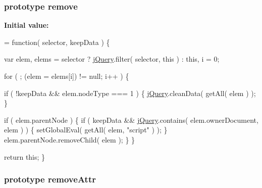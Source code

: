 \hypertarget{jquery-1_810_82-vsdoc_8js_a2bed23308c25c53346bbe769c1f6f9a5}{
\subsubsection[{remove}]{ {\bf prototype} remove}}\label{jquery-1_810_82-vsdoc_8js_a2bed23308c25c53346bbe769c1f6f9a5}
{\bfseries Initial value\-:}
\begin{DoxyCode}
= \textcolor{keyword}{function}( selector, keepData ) \{


        var elem,
            elems = selector ? \hyperlink{jquery-1_810_82-vsdoc_8js_add5237586d970a38a81f990e8eb28c6c}{jQuery}.filter( selector, \textcolor{keyword}{this} ) : \textcolor{keyword}{this},
            i = 0;

        \textcolor{keywordflow}{for} ( ; (elem = elems[i]) != null; i++ ) \{

            \textcolor{keywordflow}{if} ( !keepData && elem.nodeType === 1 ) \{
                \hyperlink{jquery-1_810_82-vsdoc_8js_add5237586d970a38a81f990e8eb28c6c}{jQuery}.cleanData( getAll( elem ) );
            \}

            \textcolor{keywordflow}{if} ( elem.parentNode ) \{
                \textcolor{keywordflow}{if} ( keepData && \hyperlink{jquery-1_810_82-vsdoc_8js_add5237586d970a38a81f990e8eb28c6c}{jQuery}.contains( elem.ownerDocument, elem ) ) \{
                    setGlobalEval( getAll( elem, \textcolor{stringliteral}{"script"} ) );
                \}
                elem.parentNode.removeChild( elem );
            \}
        \}

        \textcolor{keywordflow}{return} \textcolor{keyword}{this};
    \}
\end{DoxyCode}
\hypertarget{jquery-1_810_82-vsdoc_8js_a1bd34fb2dc2e5231033df1cff8376a17}{
\subsubsection[{remove\-Attr}]{ {\bf prototype} remove\-Attr}}\label{jquery-1_810_82-vsdoc_8js_a1bd34fb2dc2e5231033df1cff8376a17}
